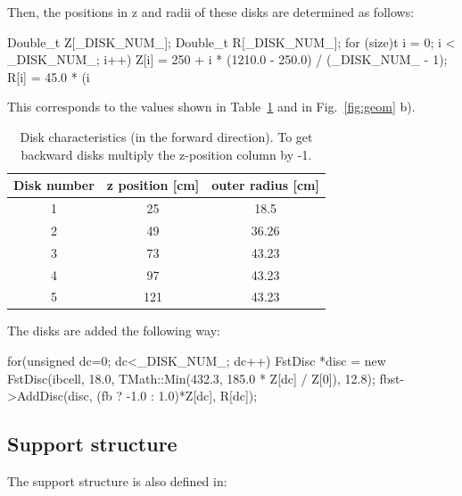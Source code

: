 \documentclass[12pt]{article}
\begin{document}
Then, the positions in z and radii of these disks are determined as follows:

\begin{tcolorbox}
\begin{verbnobox}[\scriptsize]
Double_t Z[_DISK_NUM_];
Double_t R[_DISK_NUM_];
for (size)t i = 0; i  < _DISK_NUM_; i++) {
      Z[i] = 250 + i * (1210.0 - 250.0) / (_DISK_NUM_ - 1);
      R[i] = 45.0 * (i %
}
\end{verbnobox}  
\end{tcolorbox}

This corresponds to the values shown in Table~\ref{tab:disks}
and in Fig.~\ref{fig:geom} b).

\begin{table}[H]
\centering
\caption{Disk characteristics (in the forward direction). To get backward disks multiply the z-position column by -1.}
\label{tab:disks}
\begin{tabular}{c|cc}
\hline
Disk number & z position {[}cm{]} & outer radius {[}cm{]} \\
\hline \hline
1           & 25                  & 18.5                  \\
2           & 49                  & 36.26                 \\
3           & 73                  & 43.23                 \\
4           & 97                  & 43.23                 \\
5           & 121                 & 43.23                
\end{tabular}
\end{table}

The disks are added the following way:

\begin{tcolorbox}
\begin{verbnobox}[\scriptsize]
for(unsigned dc=0; dc<_DISK_NUM_; dc++) {
    FstDisc *disc = new FstDisc(ibcell, 18.0, TMath::Min(432.3, 185.0 * Z[dc] / Z[0]), 12.8);
    fbst->AddDisc(disc, (fb ? -1.0 : 1.0)*Z[dc], R[dc]);
}
\end{verbnobox}  
\end{tcolorbox}    

\subsection{Support structure}

The support structure is also defined in:
\end{document}
